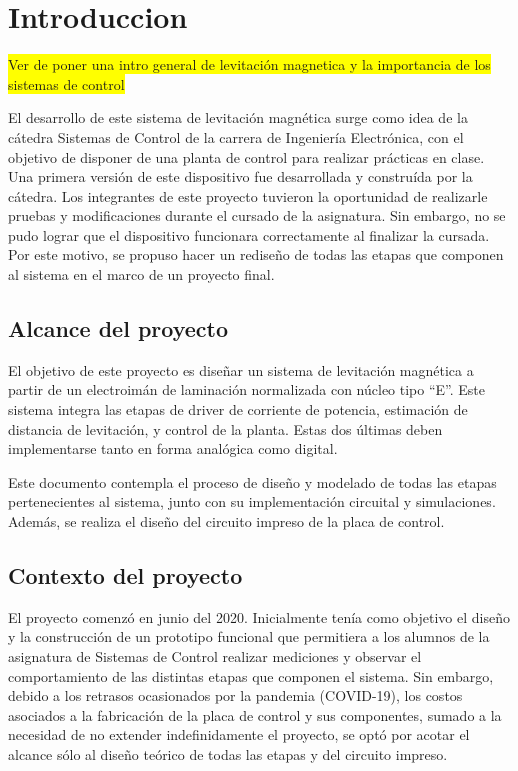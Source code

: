 \chapter{Introduccion}  \label{cap:Introducción}


\noindent \colorbox{yellow}{Ver de poner una intro general de levitación magnetica y la importancia de los sistemas de control}

\noindent El desarrollo de este sistema de levitación magnética surge como idea de la cátedra Sistemas de Control de la carrera de Ingeniería Electrónica, con el objetivo de disponer de una planta de control para realizar prácticas en clase. Una primera versión de este dispositivo fue desarrollada y construída por la cátedra. Los integrantes de este proyecto tuvieron la oportunidad de realizarle pruebas y modificaciones durante el cursado de la asignatura. Sin embargo, no se pudo lograr que el dispositivo funcionara correctamente al finalizar la cursada. Por este motivo, se propuso hacer un rediseño de todas las etapas que componen al sistema en el marco de un proyecto final.



\section{Alcance del proyecto}

\noindent El objetivo de este proyecto es diseñar un sistema de levitación magnética a partir de un electroimán de laminación normalizada con núcleo tipo “E''. Este sistema integra las etapas de driver de corriente de potencia, estimación de distancia de levitación, y control de la planta. Estas dos últimas deben implementarse tanto en forma analógica como digital.

\noindent Este documento contempla el proceso de diseño y modelado de todas las etapas pertenecientes al sistema, junto con su implementación circuital y simulaciones. Además, se realiza el diseño del circuito impreso de la placa de control.



\section{Contexto del proyecto}

\noindent El proyecto comenzó en junio del 2020. Inicialmente tenía como objetivo el diseño y la construcción de un prototipo funcional que permitiera a los alumnos de la asignatura de Sistemas de Control realizar mediciones y observar el comportamiento de las distintas etapas que componen el sistema. Sin embargo, debido a los retrasos ocasionados por la pandemia (COVID-19), los costos asociados a la fabricación de la placa de control y sus componentes, sumado a la  necesidad de no extender indefinidamente el proyecto, se optó por acotar el alcance sólo al diseño teórico de todas las etapas y del circuito impreso.

